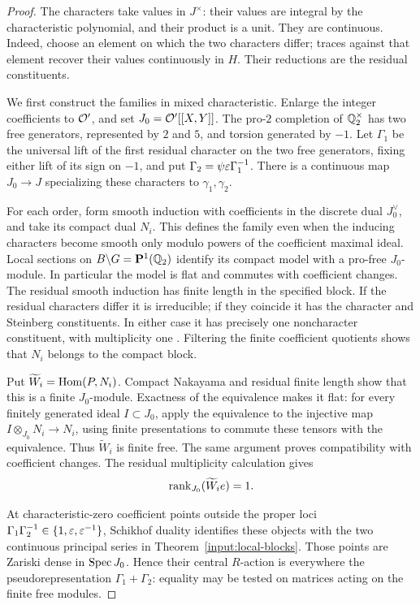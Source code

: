 \begin{proof}
The characters take values in \(J^\times\): their values are integral
by the characteristic polynomial, and their product is a unit. They
are continuous. Indeed, choose an element on which the two characters
differ; traces against that element recover their values continuously
in \(H\). Their reductions are the residual constituents.

We first construct the families in mixed characteristic. Enlarge the
integer coefficients to \(\mathcal O'\), and set
\(J_0=\mathcal O'[[X,Y]]\). The pro-\(2\) completion of
\(\mathbb Q_2^\times\) has two free generators, represented by \(2\) and
\(5\), and torsion generated by \(-1\). Let \(\Gamma_1\) be the
universal lift of the first residual character on the two free
generators, fixing either lift of its sign on \(-1\), and put
\(\Gamma_2=\psi\varepsilon\Gamma_1^{-1}\). There is a continuous map
\(J_0\to J\) specializing these characters to \(\gamma_1,\gamma_2\).

For each order, form smooth induction with coefficients in the
discrete dual \(J_0^\vee\), and take its compact dual \(N_i\).
This defines the family even when the inducing characters become
smooth only modulo powers of the coefficient maximal ideal.
Local sections on \(B\backslash G=\mathbf P^1(\mathbb Q_2)\) identify its
compact model with a pro-free \(J_0\)-module. In particular the model
is flat and commutes with coefficient changes. The residual smooth
induction has finite length in the specified block. If the residual
characters differ it is irreducible; if they coincide it has the
character and Steinberg constituents. In either case it has precisely
one noncharacter constituent, with multiplicity one
\cite[Section~4.1]{PaskunasTung2021}. Filtering the finite coefficient
quotients shows that \(N_i\) belongs to the compact block.

Put \(\widetilde W_i=\operatorname{Hom}(P,N_i)\). Compact Nakayama and residual
finite length show that this is a finite \(J_0\)-module. Exactness of
the equivalence makes it flat: for every finitely generated ideal
\(I\subset J_0\), apply the equivalence to the injective map
\(I\otimes_{J_0}N_i\to N_i\), using finite presentations to commute
these tensors with the equivalence. Thus \(\widetilde W_i\) is finite
free. The same argument proves compatibility with coefficient changes.
The residual multiplicity calculation gives
\[
                    \operatorname{rank}_{J_0}(\widetilde W_i e)=1.
\]

At characteristic-zero coefficient points outside the proper loci
\(\Gamma_1\Gamma_2^{-1}\in\{1,\varepsilon,\varepsilon^{-1}\}\), Schikhof duality
identifies these objects with the two continuous principal series in
Theorem~\ref{input:local-blocks}. Those points are Zariski dense in
\(\operatorname{Spec} J_0\). Hence their central \(R\)-action is everywhere the
pseudorepresentation \(\Gamma_1+\Gamma_2\): equality may be tested on
matrices acting on the finite free modules.


\end{proof}
